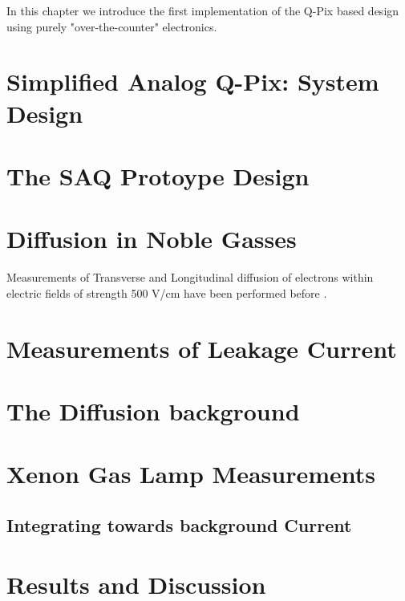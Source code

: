 In this chapter we introduce the first implementation of the Q-Pix based design using purely "over-the-counter" electronics.


\section{Simplified Analog Q-Pix: System Design}

\section{The SAQ Protoype Design}

\section{Diffusion in Noble Gasses}

Measurements of Transverse and Longitudinal diffusion of electrons within electric fields of strength 500 V/cm have been performed before \citep{lar_diffusion_measurement_LI2016160}.

\section{Measurements of Leakage Current}

\section{The Diffusion background}

\section{Xenon Gas Lamp Measurements}

\subsection{Integrating towards background Current}

\section{Results and Discussion}
